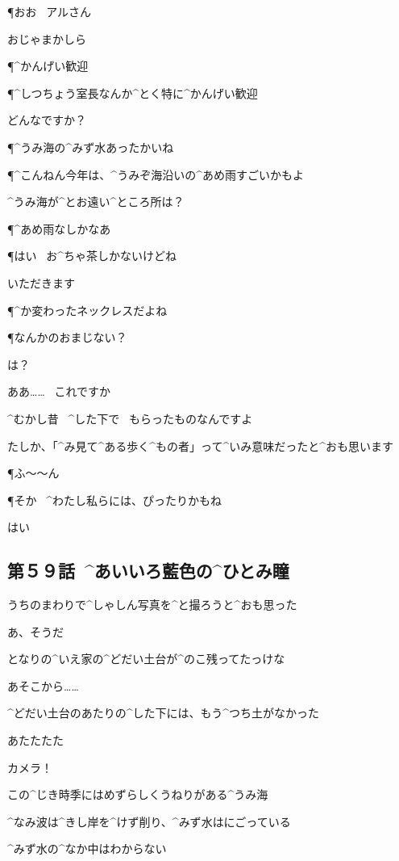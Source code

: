 \P おお
\ アルさん

\AM おじゃまかしら

\P ^{かんげい}{歓迎}

\P ^{しつちょう}{室長}なんか^{とく}{特}に^{かんげい}{歓迎}

\page
\AM どんなですか？

\P ^{うみ}{海}の^{みず}{水}あったかいね

\P ^{こんねん}{今年}は、^{うみぞ}{海沿}いの^{あめ}{雨}すごいかもよ

\AM ^{うみ}{海}が^{とお}{遠}い^{ところ}{所}は？

\P ^{あめ}{雨}なしかなあ

\P はい
\ お^{ちゃ}{茶}しかないけどね

\AM いただきます

\page[53]
\P ^{か}{変}わったネックレスだよね

\P なんかのおまじない？

\AM は？

\AM ああ……
\ これですか

\page
\AM ^{むかし}{昔}
\ ^{した}{下}で
\ もらったものなんですよ

\AM たしか、「^{み}{見}て^{ある}{歩}く^{もの}{者}」って^{いみ}{意味}だったと^{おも}{思}います

\P ふ〜〜ん

\page
\P そか
\ ^{わたし}{私}らには、ぴったりかもね

\AM はい


\subsection{第５９話\ ^{あいいろ}{藍色}の^{ひとみ}{瞳}}

\page[58]
\A うちのまわりで^{しゃしん}{写真}を^{と}{撮}ろうと^{おも}{思}った

\page
\A あ、そうだ

\A となりの^{いえ}{家}の^{どだい}{土台}が^{のこ}{残}ってたっけな

\A あそこから……

\page[61]
\A ^{どだい}{土台}のあたりの^{した}{下}には、もう^{つち}{土}がなかった

\A あたたたた

\page
\A カメラ！

\page
\A この^{じき}{時季}にはめずらしくうねりがある^{うみ}{海}

\A ^{なみ}{波}は^{きし}{岸}を^{けず}{削}り、^{みず}{水}はにごっている

\A ^{みず}{水}の^{なか}{中}はわからない

